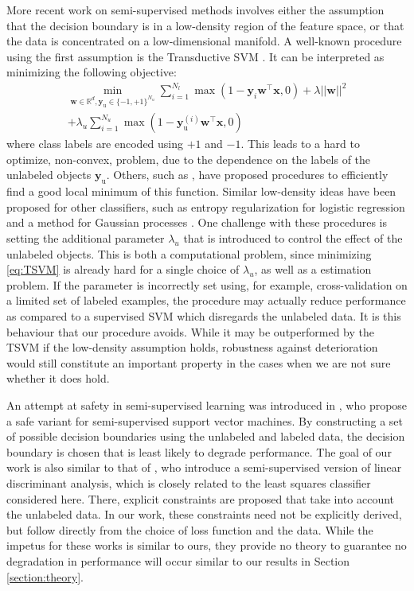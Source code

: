 \documentclass[sts,preprint]{imsart-custom}
\renewcommand{\vec}[1]{\mathbf{#1}}
\begin{document}
More recent work on semi-supervised methods involves either the assumption that the decision boundary is in a low-density region of the feature space, or that the data is concentrated on a low-dimensional manifold. A well-known procedure using the first assumption is the Transductive SVM \citep{Joachims1999}. It can be interpreted as minimizing the following objective:
\begin{multline}
\label{eq:TSVM}
\min_{\vec{w} \in \mathbb{R}^d,\vec{y}_\text{u} \in \{-1,+1\}^{N_u}} \sum_{i=1}^{N_l} \max(1-\vec{y}_i \vec{w}^\top \vec{x},0) + \lambda ||\vec{w}||^2 \\ + \lambda_u \sum_{i=1}^{N_u} \max(1-\vec{y}_\text{u}^{(i)} \vec{w}^\top \vec{x},0)
\end{multline}
where class labels are encoded using $+1$ and $-1$. This leads to a hard to optimize, non-convex, problem, due to the dependence on the labels of the unlabeled objects $\vec{y}_\text{u}$. Others, such as \citep{Sindhwani2006}, have proposed procedures to efficiently find a good local minimum of this function. Similar low-density ideas have been proposed for other classifiers, such as entropy regularization for logistic regression \citep{Grandvalet2005} and a method for Gaussian processes \citep{Lawrence2004}. One challenge with these procedures is setting the additional parameter $\lambda_u$ that is introduced to control the effect of the unlabeled objects. This is both a computational problem, since minimizing \eqref{eq:TSVM} is already hard for a single choice of $\lambda_u$, as well as a estimation problem. If the parameter is incorrectly set using, for example, cross-validation on a limited set of labeled examples, the procedure may actually reduce performance as compared to a supervised SVM which disregards the unlabeled data. It is this behaviour that our procedure avoids. While it may be outperformed by the TSVM if the low-density assumption holds, robustness against deterioration would still constitute an important property in the cases when we are not sure whether it does hold.

An attempt at safety in semi-supervised learning was introduced in \citep{Li2011}, who propose a safe variant for semi-supervised support vector machines. By constructing a set of possible decision boundaries using the unlabeled and labeled data, the decision boundary is chosen that is least likely to degrade performance. The goal of our work is also similar to that of \citep{Loog2010,Loog2014a}, who introduce a semi-supervised version of linear discriminant analysis, which is closely related to the least squares classifier considered here. There, explicit constraints are proposed that take into account the unlabeled data. In our work, these constraints need not be explicitly derived, but follow  directly from the choice of loss function and the data. While the impetus for these works is similar to ours, they provide no theory to guarantee no degradation in performance will occur similar to our results in Section \ref{section:theory}.
\end{document}

